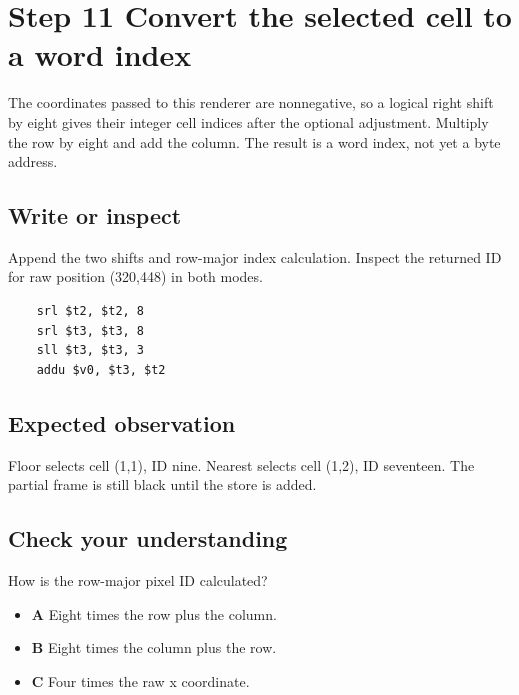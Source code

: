\section{Step 11 Convert the selected cell to a word index}\label{ball-s11}

The coordinates passed to this renderer are nonnegative, so a logical right shift by eight gives their integer cell indices after the optional adjustment. Multiply the row by eight and add the column. The result is a word index, not yet a byte address.

\subsection{Write or inspect}
Append the two shifts and row-major index calculation. Inspect the returned ID for raw position (320,448) in both modes.

\begin{verbatim}
    srl $t2, $t2, 8
    srl $t3, $t3, 8
    sll $t3, $t3, 3
    addu $v0, $t3, $t2
\end{verbatim}

\subsection{Expected observation}
Floor selects cell (1,1), ID nine. Nearest selects cell (1,2), ID seventeen. The partial frame is still black until the store is added.

\subsection{Check your understanding}
How is the row-major pixel ID calculated?

\begin{itemize}
  \item \textbf{A} Eight times the row plus the column.
  \item \textbf{B} Eight times the column plus the row.
  \item \textbf{C} Four times the raw x coordinate.
\end{itemize}
